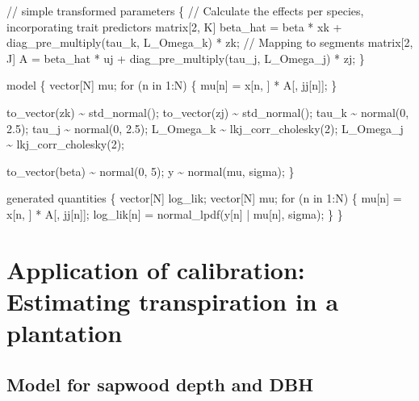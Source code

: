 \documentclass[
  12pt,
  letterpaper,
  DIV=11,
  numbers=noendperiod]{scrartcl}
\newenvironment{Shaded}{\begin{snugshade}}{\end{snugshade}}
\newcommand{\CommentTok}[1]{\textcolor[rgb]{0.37,0.37,0.37}{#1}}
\newcommand{\ControlFlowTok}[1]{\textcolor[rgb]{0.00,0.23,0.31}{#1}}
\newcommand{\DataTypeTok}[1]{\textcolor[rgb]{0.68,0.00,0.00}{#1}}
\newcommand{\DecValTok}[1]{\textcolor[rgb]{0.68,0.00,0.00}{#1}}
\newcommand{\FloatTok}[1]{\textcolor[rgb]{0.68,0.00,0.00}{#1}}
\newcommand{\KeywordTok}[1]{\textcolor[rgb]{0.00,0.23,0.31}{#1}}
\newcommand{\NormalTok}[1]{\textcolor[rgb]{0.00,0.23,0.31}{#1}}
\begin{document}
\begin{Shaded}
\begin{Highlighting}[]
\CommentTok{// simple}
\KeywordTok{transformed parameters}\NormalTok{ \{}
  \CommentTok{// Calculate the effects per species, incorporating trait predictors}
  \DataTypeTok{matrix}\NormalTok{[}\DecValTok{2}\NormalTok{, K] beta\_hat = beta * xk\textquotesingle{} + diag\_pre\_multiply(tau\_k, L\_Omega\_k) * zk;}
  \CommentTok{// Mapping to segments}
  \DataTypeTok{matrix}\NormalTok{[}\DecValTok{2}\NormalTok{, J] A = beta\_hat * uj + diag\_pre\_multiply(tau\_j, L\_Omega\_j) * zj;}
\NormalTok{\}}

\KeywordTok{model}\NormalTok{ \{}
  \DataTypeTok{vector}\NormalTok{[N] mu;}
  \ControlFlowTok{for}\NormalTok{ (n }\ControlFlowTok{in} \DecValTok{1}\NormalTok{:N) \{}
\NormalTok{    mu[n] = x[n, ] * A[, jj[n]];}
\NormalTok{  \}}

\NormalTok{  to\_vector(zk) \textasciitilde{} std\_normal();}
\NormalTok{  to\_vector(zj) \textasciitilde{} std\_normal();}
\NormalTok{  tau\_k \textasciitilde{} normal(}\DecValTok{0}\NormalTok{, }\FloatTok{2.5}\NormalTok{);}
\NormalTok{  tau\_j \textasciitilde{} normal(}\DecValTok{0}\NormalTok{, }\FloatTok{2.5}\NormalTok{);}
\NormalTok{  L\_Omega\_k \textasciitilde{} lkj\_corr\_cholesky(}\DecValTok{2}\NormalTok{);}
\NormalTok{  L\_Omega\_j \textasciitilde{} lkj\_corr\_cholesky(}\DecValTok{2}\NormalTok{);}

\NormalTok{  to\_vector(beta) \textasciitilde{} normal(}\DecValTok{0}\NormalTok{, }\DecValTok{5}\NormalTok{);}
\NormalTok{  y \textasciitilde{} normal(mu, sigma);}
\NormalTok{\}}

\KeywordTok{generated quantities}\NormalTok{ \{}
  \DataTypeTok{vector}\NormalTok{[N] log\_lik;}
  \DataTypeTok{vector}\NormalTok{[N] mu;}
  \ControlFlowTok{for}\NormalTok{ (n }\ControlFlowTok{in} \DecValTok{1}\NormalTok{:N) \{}
\NormalTok{    mu[n] = x[n, ] * A[, jj[n]];}
\NormalTok{    log\_lik[n] = normal\_lpdf(y[n] | mu[n], sigma);}
\NormalTok{  \}}
\NormalTok{\}}
\end{Highlighting}
\end{Shaded}

\newpage

\section{Application of calibration: Estimating transpiration in a
plantation}\label{application-of-calibration-estimating-transpiration-in-a-plantation}

\subsection{Model for sapwood depth and
DBH}\label{model-for-sapwood-depth-and-dbh}
\end{document}
